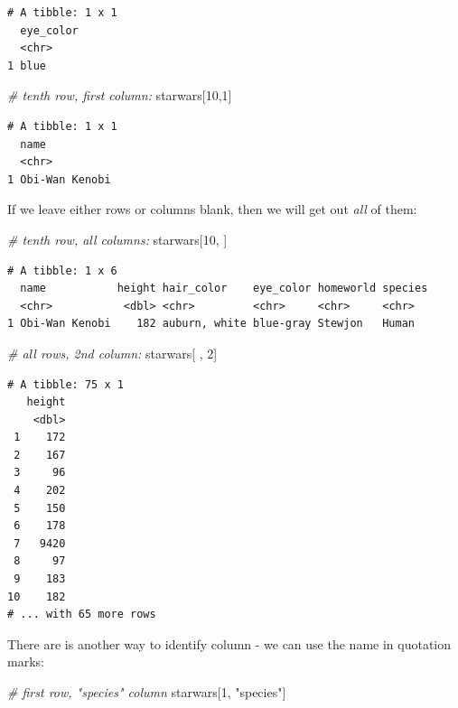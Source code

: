 \documentclass[]{book}
\newenvironment{Shaded}{\begin{snugshade}}{\end{snugshade}}
\newcommand{\CommentTok}[1]{\textcolor[rgb]{0.56,0.35,0.01}{\textit{#1}}}
\newcommand{\DecValTok}[1]{\textcolor[rgb]{0.00,0.00,0.81}{#1}}
\newcommand{\NormalTok}[1]{#1}
\newcommand{\StringTok}[1]{\textcolor[rgb]{0.31,0.60,0.02}{#1}}
\begin{document}
\begin{verbatim}
# A tibble: 1 x 1
  eye_color
  <chr>    
1 blue     
\end{verbatim}

\begin{Shaded}
\begin{Highlighting}[]
\CommentTok{# tenth row, first column:}
\NormalTok{starwars[}\DecValTok{10}\NormalTok{,}\DecValTok{1}\NormalTok{]}
\end{Highlighting}
\end{Shaded}

\begin{verbatim}
# A tibble: 1 x 1
  name          
  <chr>         
1 Obi-Wan Kenobi
\end{verbatim}

If we leave either rows or columns blank, then we will get out \emph{all} of them:

\begin{Shaded}
\begin{Highlighting}[]
\CommentTok{# tenth row, all columns:}
\NormalTok{starwars[}\DecValTok{10}\NormalTok{, ]}
\end{Highlighting}
\end{Shaded}

\begin{verbatim}
# A tibble: 1 x 6
  name           height hair_color    eye_color homeworld species
  <chr>           <dbl> <chr>         <chr>     <chr>     <chr>  
1 Obi-Wan Kenobi    182 auburn, white blue-gray Stewjon   Human  
\end{verbatim}

\begin{Shaded}
\begin{Highlighting}[]
\CommentTok{# all rows, 2nd column:}
\NormalTok{starwars[ , }\DecValTok{2}\NormalTok{]}
\end{Highlighting}
\end{Shaded}

\begin{verbatim}
# A tibble: 75 x 1
   height
    <dbl>
 1    172
 2    167
 3     96
 4    202
 5    150
 6    178
 7   9420
 8     97
 9    183
10    182
# ... with 65 more rows
\end{verbatim}

There are is another way to identify column - we can use the name in quotation marks:

\begin{Shaded}
\begin{Highlighting}[]
\CommentTok{# first row, "species" column}
\NormalTok{starwars[}\DecValTok{1}\NormalTok{, }\StringTok{"species"}\NormalTok{]}
\end{Highlighting}
\end{Shaded}
\end{document}
